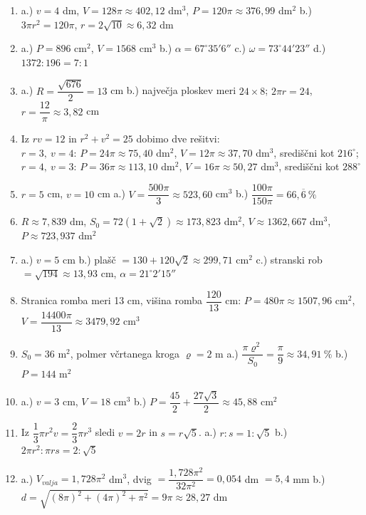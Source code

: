 \documentclass[a4paper,11pt]{letter}
\begin{document}
\begin{enumerate}
\item a.) $v=4$ dm, $V=128\pi\approx 402{,}12$ dm$^3$, $P=120\pi\approx 376{,}99$ dm$^2$ \quad
      b.) $3\pi r^2=120\pi$, $r=2\sqrt{10}\approx 6{,}32$ dm

\item a.) $P=896$ cm$^2$, $V=1568$ cm$^3$ \quad
      b.) $\alpha=67^{\circ}35'6''$ \quad
      c.) $\omega=73^{\circ}44'23''$ \quad
      d.) $1372:196=7:1$

\item a.) $R=\dfrac{\sqrt{676}}{2}=13$ cm \quad
      b.) največja ploskev meri $24\times 8$; $2\pi r=24$, $r=\dfrac{12}{\pi}\approx 3{,}82$ cm

\item Iz $rv=12$ in $r^2+v^2=25$ dobimo dve rešitvi: \\
      $r=3,\ v=4$: $P=24\pi\approx 75{,}40$ dm$^2$, $V=12\pi\approx 37{,}70$ dm$^3$,
      središčni kot $216^{\circ}$; \\
      $r=4,\ v=3$: $P=36\pi\approx 113{,}10$ dm$^2$, $V=16\pi\approx 50{,}27$ dm$^3$,
      središčni kot $288^{\circ}$

\item $r=5$ cm, $v=10$ cm \quad
      a.) $V=\dfrac{500\pi}{3}\approx 523{,}60$ cm$^3$ \quad
      b.) $\dfrac{100\pi}{150\pi}=66{,}\overline{6}\ \%$

\item $R\approx 7{,}839$ dm, $S_0=72\left(1+\sqrt{2}\right)\approx 173{,}823$ dm$^2$,
      $V\approx 1362{,}667$ dm$^3$, $P\approx 723{,}937$ dm$^2$

\item a.) $v=5$ cm \quad
      b.) plašč $=130+120\sqrt{2}\approx 299{,}71$ cm$^2$ \quad
      c.) stranski rob $=\sqrt{194}\approx 13{,}93$ cm, $\alpha=21^{\circ}2'15''$

\item Stranica romba meri 13 cm, višina romba $\dfrac{120}{13}$ cm:
      $P=480\pi\approx 1507{,}96$ cm$^2$, \ $V=\dfrac{14400\pi}{13}\approx 3479{,}92$ cm$^3$

\item $S_0=36$ m$^2$, polmer včrtanega kroga $\varrho=2$ m \quad
      a.) $\dfrac{\pi\varrho^2}{S_0}=\dfrac{\pi}{9}\approx 34{,}91\ \%$ \quad
      b.) $P=144$ m$^2$

\item a.) $v=3$ cm, $V=18$ cm$^3$ \quad
      b.) $P=\dfrac{45}{2}+\dfrac{27\sqrt{3}}{2}\approx 45{,}88$ cm$^2$

\item Iz $\dfrac{1}{3}\pi r^2v=\dfrac{2}{3}\pi r^3$ sledi $v=2r$ in $s=r\sqrt{5}$. \quad
      a.) $r:s=1:\sqrt{5}$ \quad
      b.) $2\pi r^2:\pi rs=2:\sqrt{5}$

\item a.) $V_{valja}=1{,}728\pi^2$ dm$^3$, dvig $=\dfrac{1{,}728\pi^2}{32\pi^2}=0{,}054$ dm $=5{,}4$ mm \quad
      b.) $d=\sqrt{(8\pi)^2+(4\pi)^2+\pi^2}=9\pi\approx 28{,}27$ dm
\end{enumerate}
\normalsize
\end{document}
